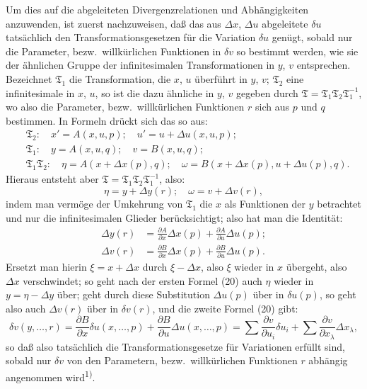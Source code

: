 \documentclass[12pt,a4paper]{article}
\begin{document}
Um dies auf die abgeleiteten Divergenzrelationen und Abh\"angigkeiten anzuwenden, ist zuerst nachzuweisen, da\ss{} das aus $\Delta x$, $\Delta u$ abgeleitete $\delta u$ tats\"achlich den Transformationsgesetzen f\"ur die Variation $\delta u$ gen\"ugt, sobald nur die Parameter, bezw.\ willk\"urlichen Funktionen in $\delta v$ so bestimmt werden, wie sie der \"ahnlichen Gruppe der infinitesimalen Transformationen in $y$, $v$ entsprechen. Bezeichnet $\mathfrak{T}_{1}$ die Transformation, die $x$, $u$ \"uberf\"uhrt in $y$, $v$; $\mathfrak{T}_{2}$ eine infinitesimale in $x$, $u$, so ist die dazu \"ahnliche in $y$, $v$ gegeben durch $\mathfrak{T}=\mathfrak{T}_{1}\mathfrak{T}_{2}\mathfrak{T}_{1}^{-1}$, wo also die Parameter, bezw.\ willk\"urlichen Funktionen $r$ sich aus $p$ und $q$ bestimmen. In Formeln dr\"uckt sich das so aus:
\begin{equation}\tag{20}
\begin{aligned}
&\mathfrak{T}_{2}:\quad x'=A(x,u,p);\quad u'=u+\Delta u(x,u,p);\\
&\mathfrak{T}_{1}:\quad y=A(x,u,q);\quad v=B(x,u,q);\\
&\mathfrak{T}_{1}\mathfrak{T}_{2}:\quad\eta=A(x+\Delta x(p),q);\quad\omega=B(x+\Delta x(p),u+\Delta u(p),q).
\end{aligned}
\end{equation}
Hieraus entsteht aber $\mathfrak{T}=\mathfrak{T}_{1}\mathfrak{T}_{2}\mathfrak{T}_{1}^{-1}$, also:
\[
\eta=y+\Delta y(r);\quad\omega=v+\Delta v(r),
\]
indem man verm\"oge der Umkehrung von $\mathfrak{T}_{1}$ die $x$ als Funktionen der $y$ betrachtet und nur die infinitesimalen Glieder ber\"ucksichtigt; also hat man die Identit\"at:
\begin{equation}\tag{20}
\begin{aligned}
\Delta y(r)&=\frac{\partial A}{\partial x}\Delta x(p)+\frac{\partial A}{\partial u}\Delta u(p);\\
\Delta v(r)&=\frac{\partial B}{\partial x}\Delta x(p)+\frac{\partial B}{\partial u}\Delta u(p).
\end{aligned}
\end{equation}
Ersetzt man hierin $\xi=x+\Delta x$ durch $\xi-\Delta x$, also $\xi$ wieder in $x$ \"ubergeht, also $\Delta x$ verschwindet; so geht nach der ersten Formel (20) auch $\eta$ wieder in $y=\eta-\Delta y$ \"uber; geht durch diese Substitution $\Delta u(p)$ \"uber in $\delta u(p)$, so geht also auch $\Delta v(r)$ \"uber in $\delta v(r)$, und die zweite Formel (20) gibt:
\begin{equation*}
\delta v(y,\ldots,r)=\frac{\partial B}{\partial x}\delta u(x,\ldots,p)+\frac{\partial B}{\partial u}\Delta u(x,\ldots,p)=\sum\frac{\partial v}{\partial u_{i}}\delta u_{i}+\sum\frac{\partial v}{\partial x_{\lambda}}\Delta x_{\lambda},
\end{equation*}
so da\ss{} also tats\"achlich die Transformationsgesetze f\"ur Variationen erf\"ullt sind, sobald nur $\delta v$ von den Parametern, bezw.\ willk\"urlichen Funktionen $r$ abh\"angig angenommen wird\textsuperscript{1)}.
\end{document}
